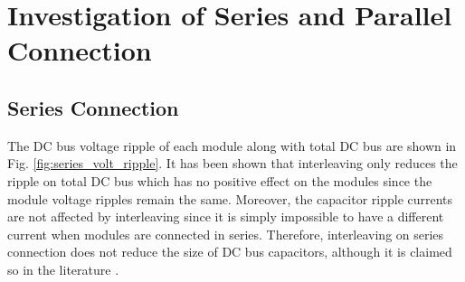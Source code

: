 \section{Investigation of Series and Parallel Connection}\label{sec:SimResults}

\subsection{Series Connection}

The DC bus voltage ripple of each module along with total DC bus are shown in Fig. \ref{fig:series_volt_ripple}. It has been shown that interleaving only reduces the ripple on total DC bus which has no positive effect on the modules since the module voltage ripples remain the same. Moreover, the capacitor ripple currents are not affected by interleaving since it is simply impossible to have a different current when modules are connected in series. Therefore, interleaving on series connection does not reduce the size of DC bus capacitors, although it is claimed so in the literature \cite{Wang2015b}. 

